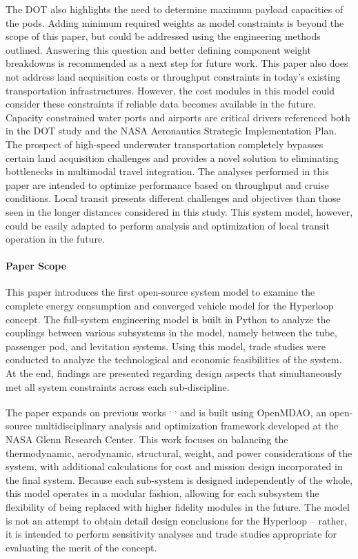 	The DOT also highlights the need to determine maximum payload capacities
	of the pods. Adding minimum required weights as model constraints is beyond the scope of
	this paper, but could be addressed using the engineering methods outlined.
	Answering this question and better defining component weight breakdowns
	is recommended as a next step for future work.
	This paper also does not address land acquisition costs or throughput
	constraints in today's existing transportation infrastructures.
	However, the cost modules in this model could consider these constraints if
	reliable data becomes available in the future.
	Capacity constrained water ports and airports are critical drivers referenced
	both in the DOT study and the NASA Aeronautics Strategic
	Implementation Plan. The prospect of high-speed underwater transportation
	completely bypasses certain land acquisition challenges and provides a novel solution
	to eliminating bottlenecks in multimodal travel integration. The analyses performed in this paper
	are intended to optimize performance based on throughput and cruise conditions.
	Local transit presents different challenges and objectives than those seen in the longer distances
	considered in this study. This system model, however, could be easily adapted to perform
	analysis and optimization of local transit operation in the future.\\

\paragraph{Paper Scope}
	This paper introduces the first open-source system model to examine the
	complete energy consumption and converged vehicle model for the Hyperloop concept.
	The full-system engineering model is built in Python to analyze the couplings
	between various subsystems in the model, namely between the tube, passenger pod, and
	levitation systems. Using this model, trade studies were conducted to analyze the technological
	and economic feasibilities of the system.
	At the end, findings are presented regarding design aspects that simultaneously
	met all system constraints across each sub-discipline.

	The paper expands on previous works \cite{Chin} \textsuperscript{,}
	\cite{goodwin2009cantera}\textsuperscript{,} \cite{GrayBenchmarking2013}
	and is built using OpenMDAO, an open-source multidisciplinary analysis and
	optimization framework developed at the NASA Glenn Research Center.
	This work focuses on balancing the thermodynamic, aerodynamic, structural,
	weight, and power considerations of the system, with additional calculations for cost
	and mission design incorporated in the final system. Because each sub-system
	is designed independently of the whole, this model operates in a modular fashion, allowing
	for each subsystem the flexibility of being replaced with higher fidelity modules in the future.
	The model is not an attempt to obtain detail design conclusions for the Hyperloop
	-- rather, it is intended to perform sensitivity analyses
	and trade studies appropriate for evaluating the merit of the concept.

